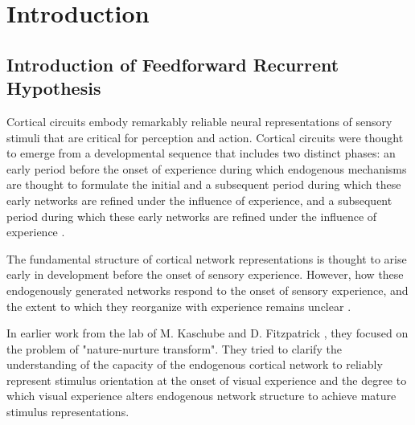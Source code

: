 \documentclass[11pt]{article}
\begin{document}
	\section{Introduction}
	\subsection{Introduction of Feedforward Recurrent Hypothesis}
	Cortical circuits embody remarkably reliable neural representations of sensory stimuli that are critical for perception and action. 
	Cortical circuits were thought to emerge from a developmental sequence that includes two distinct phases: an early period before the onset of experience during which endogenous mechanisms are thought to formulate the initial and a subsequent period during which these early networks are refined 
	under the influence of experience\cite{ackman2014role, feldheim2010visual, goodhill2016can, huberman2008mechanisms}, and a subsequent period during which these early networks are refined under the influence of experience \cite{avitan2018code, barlow1975visual, espinosa2012development, fregnac1984development, white2007vision}. 
	
	The fundamental structure of cortical network representations is thought to arise early in development before the onset of sensory experience. However, how these endogenously generated networks respond to the onset of sensory experience, and the extent to which they reorganize with experience remains unclear \cite{tragenap2023nature}. 
	
	In earlier work from the lab of M. Kaschube and D. Fitzpatrick \cite{dayan2005theoretical}, they focused on the problem of "nature-nurture transform". They tried to clarify the understanding of the capacity of the endogenous cortical network to reliably represent stimulus orientation at the onset of visual experience and the degree to which visual experience alters endogenous network structure to achieve mature stimulus representations.
\end{document}
